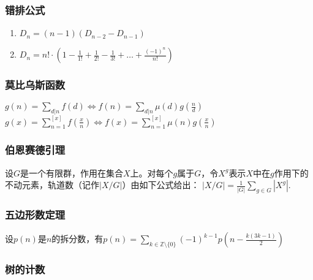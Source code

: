 \documentclass[landscape,twocolumn,a4paper]{article}
\begin{document}
\subsubsection{错排公式}

\begin{enumerate}
	\item $D_n = (n-1)(D_{n-2}-D_{n-1})$
	\item $D_n = n! \cdot (1-\frac{1}{1!}+\frac{1}{2!}-\frac{1}{3!}+\ldots+\frac{(-1)^n}{n!})$
\end{enumerate}

\subsubsection{莫比乌斯函数}
\iffalse
$\mu(n) = \begin{cases}
1 & \text{若}n=1\\
(-1)^k & \text{若}n\text{无平方数因子，且}n = p_1p_2\dots p_k\\
0 & \text{若}n\text{有大于}1\text{的平方数因数}
\end{cases}$
$\sum_{d|n}{\mu(d)} = \begin{cases}
1 & \text{若}n=1\\
0 & \text{其他情况}
\end{cases}$
\fi
$g(n) = \sum_{d|n}{f(d)} \Leftrightarrow f(n) = \sum_{d|n}{\mu(d)g(\frac{n}{d})}$
$g(x) = \sum_{n=1}^{[x]}f(\frac{x}{n}) \Leftrightarrow f(x) = \sum_{n=1}^{[x]}{\mu(n)g(\frac{x}{n})}$

\subsubsection{伯恩赛德引理}
设$G$是一个有限群，作用在集合$X$上。对每个$g$属于$G$，令$X^g$表示$X$中在$g$作用下的不动元素，轨道数（记作$|X/G|$）由如下公式给出：
$|X/G| = \frac{1}{|G|}\sum_{g \in G}|X^g|.\,$

\subsubsection{五边形数定理}

设$p(n)$是$n$的拆分数，有$p(n) = \sum_{k \in \mathbb{Z} \setminus \{0\}} (-1)^{k - 1} p\left(n - \frac{k(3k - 1)}{2}\right)$

\subsubsection{树的计数}
\end{document}
